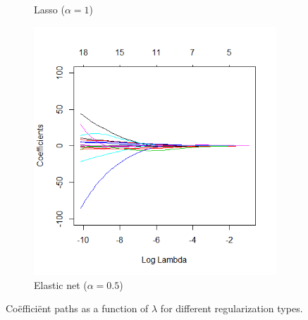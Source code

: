 \begin{figure}
\begin{subfigure}[b]{0.3\textwidth}
		\caption{Lasso ($\alpha=1$)}
		\label{fig:glm-path-lasso}
	\end{subfigure}
	\hfill
	\begin{subfigure}[b]{0.3\textwidth}
		\includegraphics[scale=0.3]{images/elastic_coefficients_path}
		\caption{Elastic net ($\alpha=0.5$)}
		\label{fig:glm-path-elastic}
	\end{subfigure}
	\caption{Co\"effici\"ent paths as a function of $\lambda$ for different regularization types.}
	\label{fig:glm-paths}
\end{figure}

